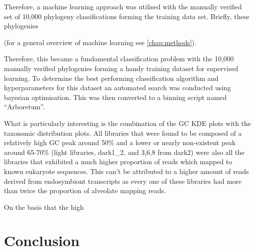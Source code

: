 Therefore, a machine learning approach was utilised with the manually verified set of 10,000 phylogeny
classifications forming the training data set. Briefly, these phylogenies 



(for a general overview of machine learning see
\ref{chap:methods}).



Therefore, this became a fundamental classification problem with the 10,000 manually verified phylogenies
forming a handy training dataset for supervised learning.   To determine the best performing
classification algorithm and hyperparameters for this dataset an automated search was conducted 
using bayesian optimisation.  This was then converted to a binning script named ``Arboretum''.



%
%



What is particularly interesting is the combination of the GC KDE plots 
with the taxonomic distribution plots.
All libraries that were found to be composed of a relatively high GC peak around 50\% 
and a lower or nearly non-existent peak around 65-70\% (light libraries, dark1\_2,
and 3,6,8 from dark2) were also all the libraries that exhibited a much higher
proportion of reads which mapped to known eukaryote sequences.
This can't be attributed to a higher amount of reads derived from endosymbiont
transcripts as every one of these libraries had more than twice the proportion of
alveolate mapping reads.



On the basis that the high 



\section{Conclusion}


